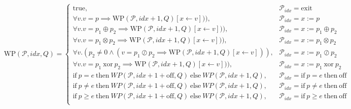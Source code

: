 \[
  \mathrm{WP}(\mathcal{P}, idx, Q) =
  \begin{cases}
    \mathrm{true}, & \mathcal{P}_{idx} = \mathrm{exit} \\
    \forall v . v = p \implies \mathrm{WP}(\mathcal{P}, idx+1, Q)[x \leftarrow v])) , & \mathcal{P}_{idx} = x := p \\    
    \forall v . v = p_1 \oplus p_2 \implies \mathrm{WP}(\mathcal{P}, idx+1, Q)[x \leftarrow v])) , & \mathcal{P}_{idx} = x := p_1 \oplus p_2 \\
    \forall v . v = p_1 \otimes p_2 \implies \mathrm{WP}(\mathcal{P}, idx+1, Q)[x \leftarrow v])) , & \mathcal{P}_{idx} = x := p_1 \otimes p_2 \\    
    \forall v . (p_2  \neq 0 \land (v = p_1 \oslash p_2 \implies \mathrm{WP}(\mathcal{P}, idx+1, Q)[x \leftarrow v])) , & \mathcal{P}_{idx} = x := p_1 \oslash p_2 \\
    \forall v . v = p_1 ~ \mathrm{xor} ~ p_2 \implies \mathrm{WP}(\mathcal{P}, idx+1, Q)[x \leftarrow v])) , & \mathcal{P}_{idx} = x := p_1 ~ \mathrm{xor} ~ p_2 \\
    \mathrm{if} ~ p = e ~ \mathrm{then} ~ WP(\mathcal{P}, idx+1+\mathrm{off}, Q) ~ \mathrm{else} ~ WP(\mathcal{P},idx+1, Q) , & \mathcal{P}_{idx} = \mathrm{if} ~ p = e ~ \mathrm{then} ~ \mathrm{\mathrm{off}} \\
    \mathrm{if} ~ p \neq e ~ \mathrm{then} ~ WP(\mathcal{P}, idx+1+\mathrm{off}, Q) ~ \mathrm{else} ~ WP(\mathcal{P},idx+1, Q) , & \mathcal{P}_{idx} = \mathrm{if} ~ p \neq e ~ \mathrm{then} ~ \mathrm{\mathrm{off}} \\    
    \mathrm{if} ~ p \geq e ~ \mathrm{then} ~ WP(\mathcal{P}, idx+1+\mathrm{off}, Q) ~ \mathrm{else} ~ WP(\mathcal{P},idx+1, Q) , & \mathcal{P}_{idx} = \mathrm{if} ~ p \geq e ~ \mathrm{then} ~ \mathrm{\mathrm{off}} \\    \end{cases}
\]


